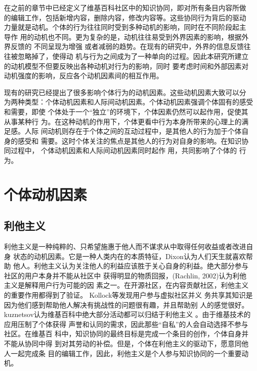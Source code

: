 在之前的章节中已经定义了维基百科社区中的知识协同，即对所有条目内容所做
的编辑工作，包括新增内容，删除内容，修改内容等。这些协同行为背后的驱动
力量就是动机。个体的行为往往同时受到多种动机的影响，同时在不同阶段起主
导作
用的动机也不同。更为复杂的是，动机往往易受到外界因素的影响，根据外界反馈的
不同呈现为增强
或者减弱的趋势。在现有的研究中，外界的信息反馈往往被忽略掉了，使得动
机与行为之间成为了一种单向的过程。因此本研究所建立的动机模型不但要反映出各种动机对行为的影响，同时
要考虑时间和外部因素对动机强度的影响，反应各个动机因素间的相互作用。

现有的研究已经提出了很多影响个体行为的动机因素。这些动机因素大致可以分
为两种类型：个体动机因素和人际间动机因素。个体动机因素强调个体固有的感受和需要，即使
个体处于一个“独立”的环境下，个体因素仍然可以起作用，促使其从事某种行
为。在这种动机的作用下，个体更看中行为本身所带来的心理上的满足感。人际
间动机则存在于个体之间的互动过程中，是其他人的行为加于个体自身的感受和
需要。这时个体关注的焦点是其他人的行为对自身的影响。在知识协同过程中，
个体动机因素和人际间动机因素同时起作
用，共同影响了个体的
行为。

\section{个体动机因素}
\label{sec:individual-factor}

\subsection{利他主义}
\label{sec:altruism}

利他主义是一种纯粹的、只希望施惠于他人而不谋求从中取得任何收益或者改进自身
状态的动机因素。它是一种人类内在的本质特征，Dixon认为人们天生就喜欢帮助
他人。利他主义认为关注他人的利益应该胜于关心自身的利益。绝大部分参与社区的用户本身并不能从社区中
获得明显的物质回报，(Rachlin, 2002)认为利他主义是解释用户行为可能的因
素之一。在开源社区，在内容贡献社区，利他主义的重要作用都得到了验证\cite{oreg2008exploring}。
Kollock等发现用户参与虚拟社区并义
务共享其知识是因为他们感到帮助他人解决有挑战性的问题很有趣，并且帮助别
人的感觉很好\cite{Smith1999}。kuznetsov认为维基百科中绝大部分活动都可以归结于利他主义
\cite{kuznetsov2006motivations}。由于维基技术的应用压制了个体获得
声誉和认同的需求，因此那些“自私”的人会自动选择不参与社区\cite{4076406}。在维基百
科中，知识协同的最终目标是完成一个条目的创作，个体自身并不能从协同中得
到对其劳动的补偿。但是，个体在利他主义的驱动下，愿意同他人一起完成条
目的编辑工作，因此，利他主义是个人参与知识协同的一个重要动机。

